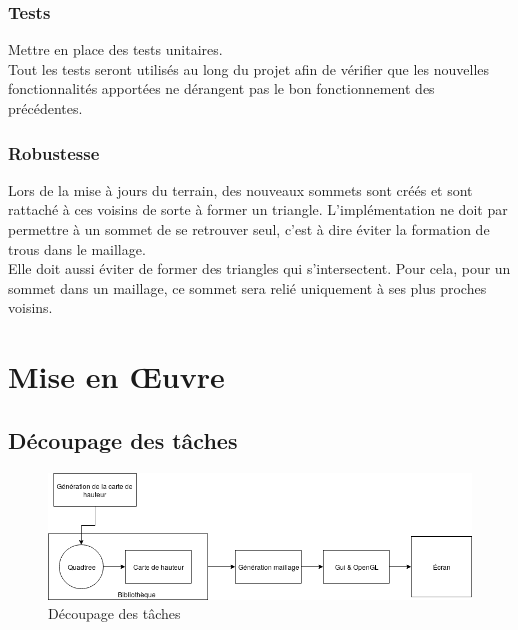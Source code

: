 \documentclass[12pt]{report}
\begin{document}
\subsection{Tests}

Mettre en place des tests unitaires.\\
Tout les tests seront utilisés au long du projet afin de vérifier que
les nouvelles fonctionnalités apportées ne dérangent pas le bon
fonctionnement des précédentes.

\subsection{Robustesse}

Lors de la mise à jours du terrain, des nouveaux sommets sont créés et
sont rattaché à ces voisins de sorte à former un triangle.
L'implémentation ne doit par permettre à un sommet de se retrouver seul,
c'est à dire éviter la formation de trous dans le maillage.\\
Elle doit aussi éviter de former des triangles qui s'intersectent. Pour
cela, pour un sommet dans un maillage, ce sommet sera relié uniquement à
ses plus proches voisins.

\newpage

\chapter*{Mise en Œuvre}
\setcounter{chapter}{4}




\section{Découpage des tâches}

\begin{center}
\begin{figure}[!h]
  \includegraphics[scale=0.5]{img/DecoupageTache.png}
  \caption{Découpage des tâches}
  \label{fig:tache}
\end{figure}
\end{center}
\end{document}
